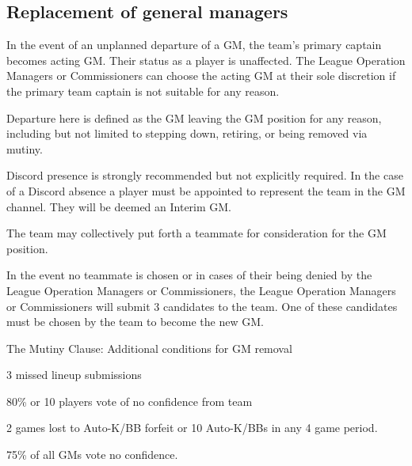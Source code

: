 \subsection{Replacement of general managers}
\begin{deepEnumerate}
	\item In the event of an unplanned departure of a GM, the team's primary captain becomes acting GM.	Their status as a player is unaffected.
	The League Operation Managers or Commissioners can choose the acting GM at their sole discretion if the primary team captain is not suitable for any reason.
	\begin{deepEnumerate}
		\item Departure here is defined as the GM leaving the GM position for any reason, including but not limited to stepping down, retiring, or being removed via mutiny.
		\begin{deepEnumerate}
			\item Discord presence is strongly recommended but not explicitly required.	In the case of a Discord absence a player must be appointed
			to represent the team in the GM channel. They will be deemed an Interim GM.
		\end{deepEnumerate}
	\end{deepEnumerate}
	\item The team may collectively put forth a teammate for consideration for the GM position.
	\item In the event no teammate is chosen or in cases of their being denied by the League Operation Managers or Commissioners,
	the League Operation Managers or Commissioners will submit 3 candidates to the team. One of these candidates must be chosen by the team to become the new GM.
	\item The Mutiny Clause: Additional conditions for GM removal
	\begin{deepEnumerate}
		\item 3 missed lineup submissions
		\item 80\% or 10 players vote of no confidence from team
		\item 2 games lost to Auto-K/BB forfeit or 10 Auto-K/BBs in any 4 game period.
		\item 75\% of all GMs vote no confidence.
	\end{deepEnumerate}
\end{deepEnumerate}

